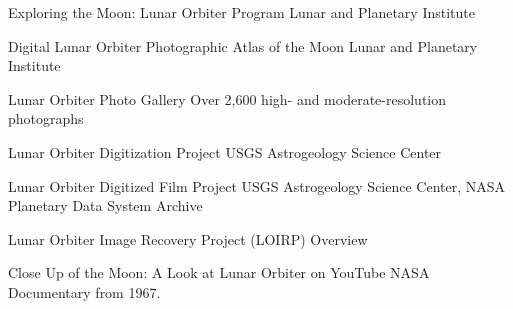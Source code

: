 Exploring the Moon: Lunar Orbiter Program Lunar and Planetary Institute

Digital Lunar Orbiter Photographic Atlas of the Moon Lunar and Planetary
Institute

Lunar Orbiter Photo Gallery Over 2,600 high- and moderate-resolution
photographs

Lunar Orbiter Digitization Project USGS Astrogeology Science Center

Lunar Orbiter Digitized Film Project USGS Astrogeology Science Center,
NASA Planetary Data System Archive

Lunar Orbiter Image Recovery Project (LOIRP) Overview

Close Up of the Moon: A Look at Lunar Orbiter on YouTube NASA
Documentary from 1967.
